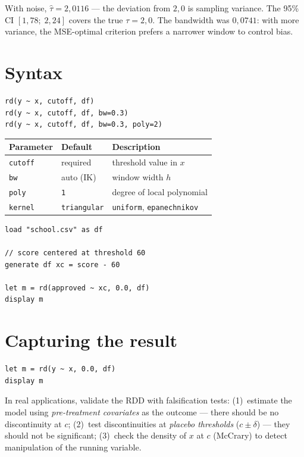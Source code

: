 With noise, $\hat\tau = 2{,}0116$ --- the deviation from $2{,}0$ is sampling
variance. The 95\% CI $[1{,}78;\; 2{,}24]$ covers the true $\tau = 2{,}0$.
The bandwidth was $0{,}0741$: with more variance, the MSE-optimal criterion
prefers a narrower window to control bias.

\section{Syntax}

\begin{lstlisting}
rd(y ~ x, cutoff, df)
rd(y ~ x, cutoff, df, bw=0.3)
rd(y ~ x, cutoff, df, bw=0.3, poly=2)
\end{lstlisting}

\begin{center}
\begin{tabular}{lll}
\toprule
\textbf{Parameter} & \textbf{Default} & \textbf{Description} \\
\midrule
\texttt{cutoff}  & required    & threshold value in $x$ \\
\texttt{bw}      & auto (IK)   & window width $h$ \\
\texttt{poly}    & \texttt{1}  & degree of local polynomial \\
\texttt{kernel}  & \texttt{triangular} & \texttt{uniform}, \texttt{epanechnikov} \\
\bottomrule
\end{tabular}
\end{center}

\begin{lstlisting}[caption={Typical workflow --- test score cutoff and scholarship}]
load "school.csv" as df

// score centered at threshold 60
generate df xc = score - 60

let m = rd(approved ~ xc, 0.0, df)
display m
\end{lstlisting}

\section{Capturing the result}

\begin{lstlisting}
let m = rd(y ~ x, 0.0, df)
display m
\end{lstlisting}

\begin{nota}
  In real applications, validate the RDD with falsification tests:
  (1)~estimate the model using \emph{pre-treatment covariates} as
  the outcome --- there should be no discontinuity at $c$;
  (2)~test discontinuities at \emph{placebo thresholds} ($c \pm \delta$)
  --- they should not be significant; (3)~check the density of $x$ at
  $c$ (McCrary) to detect manipulation of the running variable.
\end{nota}

